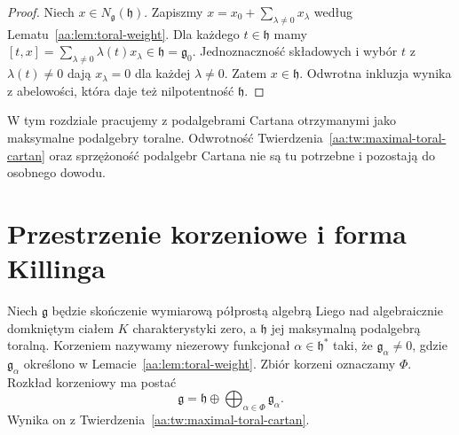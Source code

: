 \begin{proof}
Niech $x\in N_{\mathfrak g}(\mathfrak h)$. Zapiszmy $x=x_0+\sum_{\lambda\ne0}x_\lambda$ według Lematu~\ref{aa:lem:toral-weight}. Dla każdego $t\in\mathfrak h$ mamy $[t,x]=\sum_{\lambda\ne0}\lambda(t)x_\lambda\in\mathfrak h=\mathfrak g_0$. Jednoznaczność składowych i wybór $t$ z $\lambda(t)\ne0$ dają $x_\lambda=0$ dla każdej $\lambda\ne0$. Zatem $x\in\mathfrak h$. Odwrotna inkluzja wynika z abelowości, która daje też nilpotentność $\mathfrak h$.
\end{proof}

\begin{uwaga}
W tym rozdziale pracujemy z podalgebrami Cartana otrzymanymi jako maksymalne podalgebry toralne. Odwrotność Twierdzenia~\ref{aa:tw:maximal-toral-cartan} oraz sprzężoność podalgebr Cartana nie są tu potrzebne i pozostają do osobnego dowodu.
\end{uwaga}

\section{Przestrzenie korzeniowe i forma Killinga}

\begin{definicja}
\label{aa:def:lie-root}
Niech $\mathfrak g$ będzie skończenie wymiarową półprostą algebrą Liego nad algebraicznie domkniętym ciałem $K$ charakterystyki zero, a $\mathfrak h$ jej maksymalną podalgebrą toralną. Korzeniem nazywamy niezerowy funkcjonał $\alpha\in\mathfrak h^*$ taki, że $\mathfrak g_\alpha\ne0$, gdzie $\mathfrak g_\alpha$ określono w Lemacie~\ref{aa:lem:toral-weight}. Zbiór korzeni oznaczamy $\Phi$. Rozkład korzeniowy ma postać
\[
 \mathfrak g=\mathfrak h\oplus\bigoplus_{\alpha\in\Phi}\mathfrak g_\alpha.
\]
Wynika on z Twierdzenia~\ref{aa:tw:maximal-toral-cartan}.
\end{definicja}

